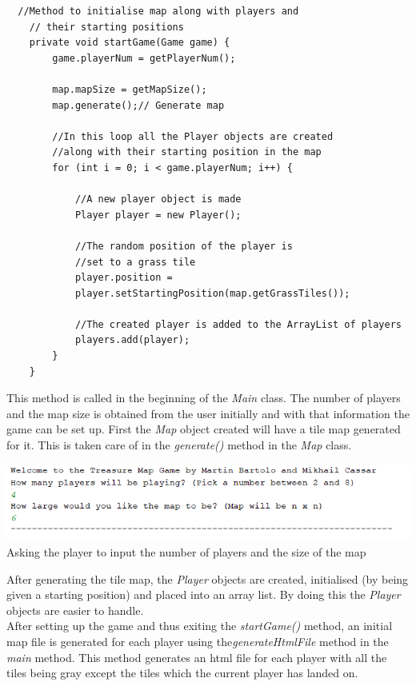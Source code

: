 \documentclass[a4paper,12pt]{extarticle}
\begin{document}
\newpage
\begin{lstlisting}
  //Method to initialise map along with players and
    // their starting positions
    private void startGame(Game game) {
        game.playerNum = getPlayerNum();

        map.mapSize = getMapSize();
        map.generate();// Generate map

        //In this loop all the Player objects are created 
        //along with their starting position in the map
        for (int i = 0; i < game.playerNum; i++) {

            //A new player object is made
            Player player = new Player();

            //The random position of the player is 
            //set to a grass tile
            player.position = 
            player.setStartingPosition(map.getGrassTiles());

            //The created player is added to the ArrayList of players
            players.add(player);
        }
    }
\end{lstlisting}
\vspace{4mm}

\noindent This method is called in the beginning of the \textit{Main} class. The number of players and the map size is obtained from the user initially and with that information the game can be set up. First the \textit{Map} object created will have a tile map generated for it. This is taken care of in the \textit{generate()} method in the \textit{Map} class.\\

\begin{center}
\includegraphics[scale=0.5]{BasicMap2.png}\\
Asking the player to input the number of players and the size of the map
\end{center}

\noindent After generating the tile map, the \textit{Player} objects are created, initialised (by being given a starting position) and placed into an array list. By doing this the \textit{Player} objects are easier to handle.\\

\noindent After setting up the game and thus exiting the \textit{startGame()} method, an initial map file is generated for each player using the\textit{generateHtmlFile} method in the \textit{main} method. This method generates an html file for each player with all the tiles being gray except the tiles which the current player has landed on.\\
\end{document}
